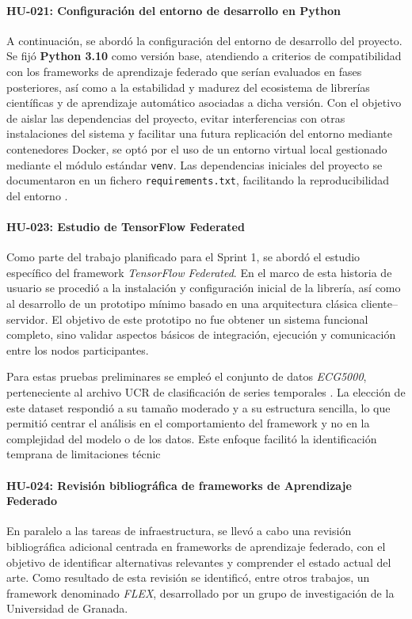 \documentclass{report}
\begin{document}
\paragraph{HU-021: Configuración del entorno de desarrollo en Python}
A continuación, se abordó la configuración del entorno de desarrollo del proyecto. Se fijó \textbf{Python 3.10} como versión base, atendiendo a criterios de compatibilidad con los frameworks de aprendizaje federado que serían evaluados en fases posteriores, así como a la estabilidad y madurez del ecosistema de librerías científicas y de aprendizaje automático asociadas a dicha versión. Con el objetivo de aislar las dependencias del proyecto, evitar interferencias con otras instalaciones del sistema y facilitar una futura replicación del entorno mediante contenedores Docker, se optó por el uso de un entorno virtual local gestionado mediante el módulo estándar \texttt{venv}. Las dependencias iniciales del proyecto se documentaron en un fichero \texttt{requirements.txt}, facilitando la reproducibilidad del entorno \cite{pythonVenvDocs}.

\paragraph{HU-023: Estudio de TensorFlow Federated}
Como parte del trabajo planificado para el Sprint 1, se abordó el estudio específico del framework \textit{TensorFlow Federated}. En el marco de esta historia de usuario se procedió a la instalación y configuración inicial de la librería, así como al desarrollo de un prototipo mínimo basado en una arquitectura clásica cliente--servidor. El objetivo de este prototipo no fue obtener un sistema funcional completo, sino validar aspectos básicos de integración, ejecución y comunicación entre los nodos participantes.

Para estas pruebas preliminares se empleó el conjunto de datos \textit{ECG5000}, perteneciente al archivo UCR de clasificación de series temporales \cite{Dau2019UCR}. La elección de este dataset respondió a su tamaño moderado y a su estructura sencilla, lo que permitió centrar el análisis en el comportamiento del framework y no en la complejidad del modelo o de los datos. Este enfoque facilitó la identificación temprana de limitaciones técnic


\paragraph{HU-024: Revisión bibliográfica de frameworks de Aprendizaje Federado}
En paralelo a las tareas de infraestructura, se llevó a cabo una revisión bibliográfica adicional centrada en frameworks de aprendizaje federado, con el objetivo de identificar alternativas relevantes y comprender el estado actual del arte. Como resultado de esta revisión se identificó, entre otros trabajos, un framework denominado \emph{FLEX}, desarrollado por un grupo de investigación de la Universidad de Granada.
\end{document}
